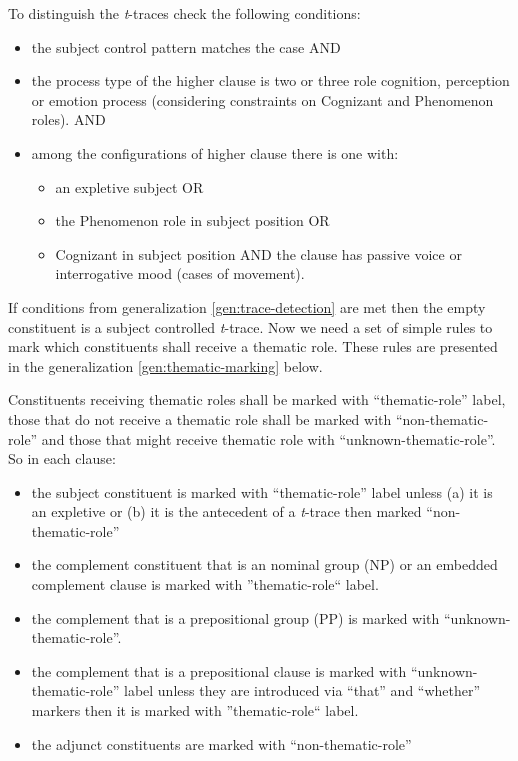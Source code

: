 \begin{generalization}\label{gen:trace-detection}
	To distinguish the \textit{t}-traces check the following conditions:
	\begin{itemize}
		\item the subject control pattern matches the case AND
		\item the process type of the higher clause is two or three role cognition, perception or emotion process (considering constraints on Cognizant and Phenomenon roles). AND
		\item among the configurations of higher clause there is one with:
		\begin{itemize}
			\item an expletive subject OR
			\item the Phenomenon role in subject position OR
			\item Cognizant in subject position AND the clause has passive voice or interrogative mood (cases of movement).
		\end{itemize}
	\end{itemize}
\end{generalization}
If conditions from generalization \ref{gen:trace-detection} are met then the empty constituent is a subject controlled \textit{t}-trace. Now we need a set of simple rules to mark which constituents shall receive a thematic role. These rules are  presented in the generalization \ref{gen:thematic-marking} below.

\begin{generalization}\label{gen:thematic-marking}
	Constituents receiving thematic roles shall be marked with ``thematic-role'' label, those that do not receive a thematic role shall be marked with ``non-thematic-role'' and those that might receive thematic role with ``unknown-thematic-role''. So in each clause:
	\begin{itemize}
		\item the subject constituent is marked with ``thematic-role'' label unless (a) it is an expletive or (b) it is the antecedent of a \textit{t}-trace then marked ``non-thematic-role''
		\item the complement constituent that is an nominal group (NP) or an embedded complement clause is marked with ''thematic-role`` label.
		\item the  complement that is a prepositional group (PP) is marked with ``unknown-thematic-role''.
		\item the complement that is a prepositional clause is marked with ``unknown-thematic-role'' label unless they are introduced via ``that'' and ``whether'' markers then it is marked with ''thematic-role`` label.
		\item the adjunct constituents are marked with ``non-thematic-role''
	\end{itemize}
\end{generalization}

